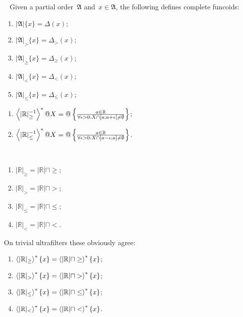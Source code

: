 \begin{defn}
~
Given a partial order~$\mathfrak{A}$ and~$x\in\mathfrak{A}$, the following defines complete funcoids:
\begin{enumerate}
\item $|\mathfrak{A}|\{x\} = \Delta(x)$;
\item $|\mathfrak{A}|_{>}\{x\} = \Delta_{>}(x)$;
\item $|\mathfrak{A}|_{\geq}\{x\} = \Delta_{\geq}(x)$;
\item $|\mathfrak{A}|_{<}\{x\} = \Delta_{<}(x)$;
\item $|\mathfrak{A}|_{\leq}\{x\} = \Delta_{\leq}(x)$;
\end{enumerate}
\end{defn}

\begin{xca}
\begin{enumerate}
\item $\left\langle |\mathbb{R}|_{\geq}^{-1}\right\rangle ^{\ast}@X = @\left\{ \frac{a\in\mathbb{R}}{\forall\epsilon>0:X\cap[a;a+\epsilon[\ne\emptyset}\right\}$;
\item $\left\langle |\mathbb{R}|_{\leq}^{-1}\right\rangle ^{\ast}@X = @\left\{ \frac{a\in\mathbb{R}}{\forall\epsilon>0:X\cap]a-\epsilon;a]\ne\emptyset}\right\}$.
\end{enumerate}
\end{xca}

\begin{conjecture}
~
\begin{enumerate}
\item $|\mathbb{R}|_{\geq} = |\mathbb{R}| \sqcap \geq$;
\item $|\mathbb{R}|_{>} = |\mathbb{R}| \sqcap >$;
\item $|\mathbb{R}|_{\leq} = |\mathbb{R}| \sqcap \leq$;
\item $|\mathbb{R}|_{<} = |\mathbb{R}| \sqcap <$.
\end{enumerate}
\end{conjecture}

\begin{rem}
On trivial ultrafilters these obviously agree:
\begin{enumerate}
\item $\left\langle |\mathbb{R}|_{\geq}\right\rangle ^{\ast}\{x\} = \left\langle |\mathbb{R}| \sqcap \geq\right\rangle ^{\ast}\{x\}$;
\item $\left\langle |\mathbb{R}|_{>}\right\rangle ^{\ast}\{x\} = \left\langle |\mathbb{R}| \sqcap >\right\rangle ^{\ast}\{x\}$;
\item $\left\langle |\mathbb{R}|_{\leq}\right\rangle ^{\ast}\{x\} = \left\langle |\mathbb{R}| \sqcap \leq\right\rangle ^{\ast}\{x\}$;
\item $\left\langle |\mathbb{R}|_{<}\right\rangle ^{\ast}\{x\} = \left\langle |\mathbb{R}| \sqcap <\right\rangle ^{\ast}\{x\}$.
\end{enumerate}
\end{rem}

